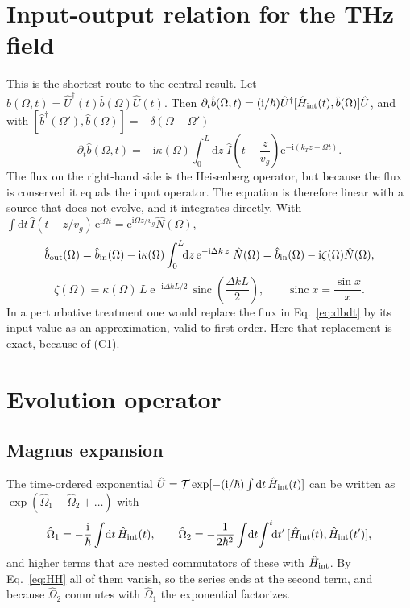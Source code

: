 \documentclass[aps,pra,onecolumn,notitlepage,11pt,amsmath,amssymb,nofootinbib]{revtex4-2}
\newcommand{\Nop}{\hat N}
\newcommand{\Iop}{\hat I}
\newcommand{\dd}{\mathrm{d}}
\newcommand{\ee}{\mathrm{e}}
\newcommand{\ii}{\mathrm{i}}
\newcommand{\sinc}{\operatorname{sinc}}
\begin{document}
\section{Input-output relation for the THz field}
\label{sec:heis}

This is the shortest route to the central result. Let
$\hat b(\Omega,t)=\hat U^\dagger(t)\hat b(\Omega)\hat U(t)$. Then
$\partial_t\hat b(\Omega,t)=(\ii/\hbar)\hat U^\dagger[\hat H_{\rm int}(t),\hat
b(\Omega)]\hat U$, and with
$[\hat b^\dagger(\Omega'),\hat b(\Omega)]=-\delta(\Omega-\Omega')$
\begin{equation}
\partial_t\hat b(\Omega,t)=-\ii\kappa(\Omega)\int_0^L\!\!\dd z\;
\Iop\!\left(t-\frac{z}{v_g}\right)\ee^{-\ii(k_Tz-\Omega t)} .
\label{eq:dbdt}
\end{equation}
The flux on the right-hand side is the Heisenberg operator, but because the
flux is conserved it equals the input operator. The equation is therefore
linear with a source that does not evolve, and it integrates directly. With
$\int\dd t\,\Iop(t-z/v_g)\,\ee^{\ii\Omega t}=\ee^{\ii\Omega z/v_g}\Nop(\Omega)$,
\begin{equation}
\hat b_{\rm out}(\Omega)=\hat b_{\rm in}(\Omega)
-\ii\kappa(\Omega)\int_0^L\!\!\dd z\,\ee^{-\ii\Delta k\,z}\;\Nop(\Omega)
=\hat b_{\rm in}(\Omega)-\ii\zeta(\Omega)\Nop(\Omega),
\end{equation}
\begin{equation}
\boxed{\;\zeta(\Omega)=\kappa(\Omega)\,L\;\ee^{-\ii\Delta kL/2}\,
\sinc\!\left(\frac{\Delta kL}{2}\right),\qquad \sinc x=\frac{\sin x}{x}.\;}
\label{eq:zeta}
\end{equation}
In a perturbative treatment one would replace the flux in
Eq.~\eqref{eq:dbdt} by its input value as an approximation, valid to first
order. Here that replacement is exact, because of (C1).

\section{Evolution operator}

\subsection{Magnus expansion}

The time-ordered exponential
$\hat U=\mathcal T\exp[-(\ii/\hbar)\int\dd t\,\hat H_{\rm int}(t)]$ can be
written as $\exp(\hat\Omega_1+\hat\Omega_2+\dots)$ \cite{blanes2009} with
\begin{equation}
\hat\Omega_1=-\frac{\ii}{\hbar}\int\!\dd t\,\hat H_{\rm int}(t),\qquad
\hat\Omega_2=-\frac{1}{2\hbar^2}\int\!\dd t\!\int^{t}\!\!\dd t'\,
[\hat H_{\rm int}(t),\hat H_{\rm int}(t')],
\end{equation}
and higher terms that are nested commutators of these with
$\hat H_{\rm int}$. By Eq.~\eqref{eq:HH} all of them vanish, so the series
ends at the second term, and because $\hat\Omega_2$ commutes with
$\hat\Omega_1$ the exponential factorizes.
\end{document}
